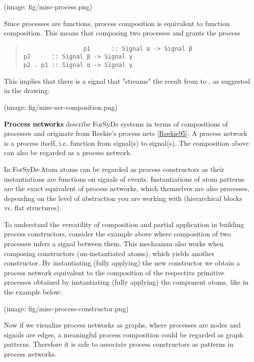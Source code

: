  (image: fig/misc-process.png)\par
                 Since processes are functions, process composition is equivalent
 to function composition. This means that composing two processes
  and  grants the process \par
                 \begin{quote}
                 {\haddockverb\begin{verbatim}
                 p1      :: Signal α -> Signal β
p2      :: Signal β -> Signal γ
p2 . p1 :: Signal α -> Signal γ\end{verbatim}}
                 \end{quote}
                 This implies that there is a signal  that
  "streams" the result from  to , as suggested in the
  drawing:\par
                 (image: fig/misc-ser-composition.png)\par
                 \textbf{Process networks} describe ForSyDe systems in terms of
 compositions of processes and originate from Reekie's process
 nets \href{#reekie95}{[Reekie95]}. A process network is a process itself,
 i.e. function from signal(s) to signal(s). The composition above
  can also be regarded as a process network.\par
                 In ForSyDe-Atom atoms can be regarded as process constructors as
 their instantiations are functions on signals of events.
 Instantiations of atom patterns are the exact equivalent of
 process networks, which themselves are also processes, depending
 on the level of abstraction you are working with (hierarchical
 blocks vs. flat structures).\par
                 To understand the versatility of composition and partial
 application in building process constructors, consider the
 example above where composition of two processes infers a signal
 between them. This mechanism also works when composing
 constructors (un-instantiated atoms), which yields another
 constructor. By instantiating (fully applying) the new
 constructor we obtain a process network equivalent to the
 composition of the respective primitive processes obtained by
 instantiating (fully applying) the component atoms, like in the
 example below:\par
                 (image: fig/misc-process-constructor.png)\par
                 Now if we visualize process networks as graphs, where processes
 are nodes and signals are edges, a meaningful process composition
 could be regarded as graph patterns. Therefore it is safe to
 associate process constructors as patterns in process networks.\par
                 
